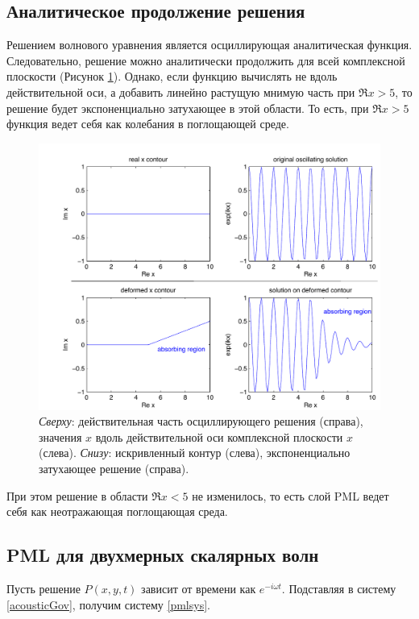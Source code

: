 \documentclass[a4paper, fontsize=14pt]{article}
\begin{document}
\subsection{Аналитическое продолжение решения}
	Решением волнового уравнения является осциллирующая аналитическая функция. Следовательно, решение
можно аналитически продолжить для всей комплексной плоскости (Рисунок \ref{pmlcont}). Однако, если функцию вычислять не
вдоль действительной оси, а добавить линейно растущую мнимую часть при $\Re x > 5$, то решение будет
экспоненциально затухающее в этой области. То есть, при $\Re x > 5$ функция ведет себя как колебания в
поглощающей среде. 
\begin{figure}[H]
	\centering
	\includegraphics[width=1\columnwidth]{pml-continuation}
	\caption{\emph{Сверху}: действительная часть осциллирующего решения (справа), значения $x$ вдоль
	действительной оси комплексной плоскости $x$ (слева).
	\emph{Снизу}: искривленный контур (слева), экспоненциально затухающее решение (справа). 
	}
	\label{pmlcont}

\end{figure}

При этом решение в области $\Re x < 5$ не изменилось, то есть слой PML ведет себя как неотражающая
поглощающая среда.
\subsection{PML для двухмерных скалярных волн}
Пусть решение $P(x,y,t)$ зависит от времени как $e^{-i \omega t}$. Подставляя в систему
\ref{acousticGov}, получим систему \ref{pmlsys}.
\end{document}
